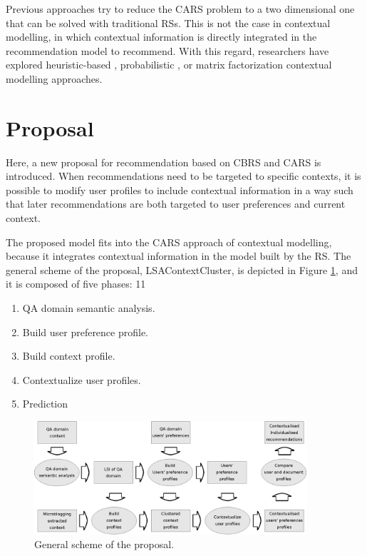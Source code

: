 \documentclass[preprint]{elsarticle}
\begin{document}
\begin{spacing}{1.5}
Previous approaches try to reduce the CARS problem to a two dimensional one that can be solved with traditional RSs. This is not the case in contextual modelling, in which contextual information is directly integrated in the recommendation model to recommend. With this regard, researchers have explored heuristic-based \cite{Panniello2014}, probabilistic \cite{Adomavicius2005b}, or matrix factorization \cite{Baltrunas2011c} contextual modelling approaches.

\section{Proposal}
\label{sec:proposal}

Here, a new proposal for recommendation based on CBRS and CARS is introduced. When recommendations need to be targeted to specific contexts, it is possible to modify user profiles to include contextual information in a way such that later recommendations are both targeted to user preferences and current context.

The proposed model fits into the CARS approach of contextual modelling, because it integrates contextual information in the model built by the RS. The general scheme of the proposal, LSAContextCluster, is depicted in Figure \ref{fig:proposal-scheme}, and it is composed of five phases:
11
\begin{enumerate}
	\item QA domain semantic analysis.
	\item Build user preference profile.
	\item Build context profile.
	\item Contextualize user profiles.
	\item Prediction
\end{enumerate}

\begin{figure}[h]
	\centering
	\includegraphics[width=0.9\textwidth]{figures/proposal-scheme.eps}
	\caption{General scheme of the proposal.}
	\label{fig:proposal-scheme}
\end{figure}


\end{spacing}
\end{document}

